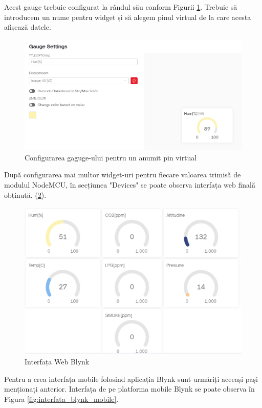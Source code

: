 Acest gauge trebuie configurat la rândul său conform Figurii \ref{fig:config_gauge}. Trebuie să introducem un nume pentru widget și să alegem pinul virtual de la care acesta afișează datele.

\begin{figure}[H]
\includegraphics[width=0.8\linewidth]{bachelors_ro/images/config_gauge.png}
\caption{Configurarea gaguge-ului pentru un anumit pin virtual\cite{templ_blynk}}
\label{fig:config_gauge}
\end{figure}

După configurarea mai multor widget-uri pentru fiecare valoarea trimisă de modulul NodeMCU, în secțiunea "Devices" se poate observa interfața web finală obținută. (\ref{fig:interfata_blynk}).

\begin{figure}[H]
\includegraphics[width=0.7\linewidth]{bachelors_ro/images/interfata_blynk.png}
\caption{Interfața Web Blynk \cite{templ_blynk}}
\label{fig:interfata_blynk}
\end{figure}

Pentru a crea interfața mobile folosind aplicația Blynk sunt urmăriți aceeași pași menționați anterior. Interfața de pe platforma mobile Blynk se poate observa în Figura \ref{fig:interfata_blynk_mobile}.

